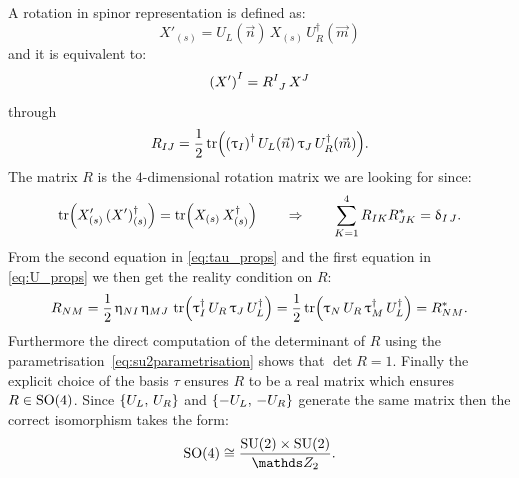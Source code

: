A rotation in spinor representation is defined as:
\begin{equation}
  X'_{(s)} = U_{L}(\vec{n})\, X_{(s)}\, U_{R}^{\dagger}(\vec{m})
\end{equation}
and it is equivalent to:
\begin{equation}
  \qty( X' )^I
  =
  \tensor{R}{^I_J}\,
  X^J
\end{equation}
through
\begin{equation}
  R_{IJ}
  =
  \frac{1}{2}
  \tr(
    \qty( \uptau_I )^{\dagger}\,
    U_{L}(\vec{n})\,
    \uptau_J\,
    U_{R}^{\dagger}(\vec{m})
  ).
\end{equation}
The matrix $R$ is the $4$-dimensional rotation matrix we are looking for since:
\begin{equation}
  \tr(X'_{(s)}\, (X')^{\dagger}_{(s)})
  =
  \tr(X_{(s)}\, X^{\dagger}_{(s)})
  \qquad
  \Rightarrow
  \qquad
  \sum\limits_{K = 1}^{4} R_{IK} R^*_{JK} = \updelta_{I \,J}.
\end{equation}
From the second equation in \eqref{eq:tau_props} and the first equation in \eqref{eq:U_props} we then get the reality condition on $R$:
\begin{equation}
  R_{NM}
  =
  \frac{1}{2}\, \upeta_{NI}\, \upeta_{MJ}\,
  \tr(\uptau_I ^{\dagger}\, U_{R}\, \uptau_J\, U_{L}^{\dagger})
  =
  \frac{1}{2}
  \tr(\uptau_N\, U_{R}\, \uptau_M^\dagger\, U_{L}^{\dagger})
  =
  R_{NM}^*.
\end{equation}
Furthermore the direct computation of the determinant of $R$ using the parametrisation~\eqref{eq:su2parametrisation} shows that $\det R = 1$.
Finally the explicit choice of the basis $\tau$ ensures $R$ to be a real matrix which ensures $R \in \mathrm{SO}(4)$.
Since $\qty{ U_{L},\, U_{R} }$ and $\qty{ -U_{L},\, -U_{R} }$ generate the same  matrix then the correct isomorphism takes the form:
\begin{equation}
  \SO{4}
  \cong
  \frac{\SU{2} \times \SU{2}}{\Z_2}.
\end{equation}

